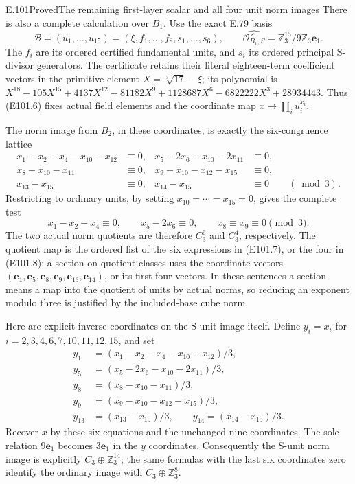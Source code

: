 \begin{statement}{E.101}{Proved}{The remaining first-layer scalar and all four unit norm images}
There is also a complete calculation over \(B_1\).
Use the exact E.79 basis
\[
 \mathcal B=(u_1,\ldots,u_{15})
   =(\xi,f_1,\ldots,f_8,s_1,\ldots,s_6),\qquad
 \widehat{\mathcal O_{B_1,S}^{\times}}
   =\mathbb Z_3^{15}/9\mathbb Z_3\mathbf e_1.
 \tag{E101.6}
\]
The \(f_i\) are its ordered certified fundamental units,
and \(s_i\) its ordered principal S-divisor generators.
The certificate retains their literal eighteen-term
coefficient vectors in the primitive element
\(X=\sqrt[3]{17}-\xi\); its polynomial is
\(X^{18}-105X^{15}+4137X^{12}-81182X^9
 +1128687X^6-6822222X^3+28934443\).
Thus (E101.6) fixes actual field elements and the
coordinate map \(x\mapsto\prod_i u_i^{x_i}\).

The norm image from \(B_2\), in these coordinates, is
exactly the six-congruence lattice
\[
 \begin{aligned}
 x_1-x_2-x_4-x_{10}-x_{12}&\equiv0, &
 x_5-2x_6-x_{10}-2x_{11}&\equiv0,\\
 x_8-x_{10}-x_{11}&\equiv0, &
 x_9-x_{10}-x_{12}-x_{15}&\equiv0,\\
 x_{13}-x_{15}&\equiv0, &x_{14}-x_{15}&\equiv0
 \qquad(\bmod3).
 \end{aligned}
 \tag{E101.7}
\]
Restricting to ordinary units, by setting
\(x_{10}=\cdots=x_{15}=0\), gives the complete test
\[
 x_1-x_2-x_4\equiv0,\qquad x_5-2x_6\equiv0,
 \qquad x_8\equiv x_9\equiv0\pmod3.
 \tag{E101.8}
\]
The two actual norm quotients are therefore \(C_3^6\)
and \(C_3^4\), respectively. The quotient map is the
ordered list of the six expressions in (E101.7), or
the four in (E101.8); a section on quotient classes
uses the coordinate vectors
\((\mathbf e_1,\mathbf e_5,\mathbf e_8,
  \mathbf e_9,\mathbf e_{13},\mathbf e_{14})\),
or its first four vectors. In these sentences a
section means a map into the quotient of units by
actual norms, so reducing an exponent modulo three
is justified by the included-base cube norm.

Here are explicit inverse coordinates on the S-unit
image itself. Define \(y_i=x_i\) for
\(i=2,3,4,6,7,10,11,12,15\), and set
\[
 \begin{aligned}
 y_1&=(x_1-x_2-x_4-x_{10}-x_{12})/3,\\
 y_5&=(x_5-2x_6-x_{10}-2x_{11})/3,\\
 y_8&=(x_8-x_{10}-x_{11})/3,\\
 y_9&=(x_9-x_{10}-x_{12}-x_{15})/3,\\
 y_{13}&=(x_{13}-x_{15})/3,
 \qquad y_{14}=(x_{14}-x_{15})/3.
 \end{aligned}
 \tag{E101.9}
\]
Recover \(x\) by these six equations and the unchanged
nine coordinates. The sole relation \(9\mathbf e_1\)
becomes \(3\mathbf e_1\) in the \(y\) coordinates.
Consequently the S-unit norm image is explicitly
\(C_3\oplus\mathbb Z_3^{14}\); the same formulas with
the last six coordinates zero identify the ordinary
image with \(C_3\oplus\mathbb Z_3^8\).


\end{statement}
